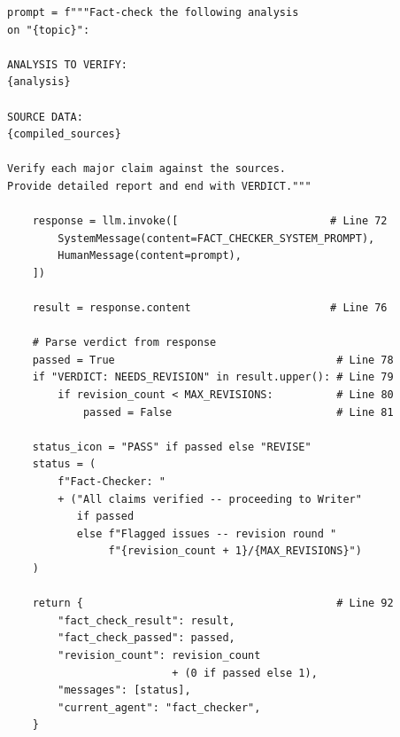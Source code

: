 \documentclass[12pt, a4paper]{article}
\begin{document}
\begin{lstlisting}[style=pythonstyle, title={\color{accentgreen}\faIcon{file} agents/fact\_checker.py --- Full Code (107 lines)}]
    prompt = f"""Fact-check the following analysis
on "{topic}":

ANALYSIS TO VERIFY:
{analysis}

SOURCE DATA:
{compiled_sources}

Verify each major claim against the sources.
Provide detailed report and end with VERDICT."""

    response = llm.invoke([                        # Line 72
        SystemMessage(content=FACT_CHECKER_SYSTEM_PROMPT),
        HumanMessage(content=prompt),
    ])

    result = response.content                      # Line 76

    # Parse verdict from response
    passed = True                                   # Line 78
    if "VERDICT: NEEDS_REVISION" in result.upper(): # Line 79
        if revision_count < MAX_REVISIONS:          # Line 80
            passed = False                          # Line 81

    status_icon = "PASS" if passed else "REVISE"
    status = (
        f"Fact-Checker: "
        + ("All claims verified -- proceeding to Writer"
           if passed
           else f"Flagged issues -- revision round "
                f"{revision_count + 1}/{MAX_REVISIONS}")
    )

    return {                                        # Line 92
        "fact_check_result": result,
        "fact_check_passed": passed,
        "revision_count": revision_count
                          + (0 if passed else 1),
        "messages": [status],
        "current_agent": "fact_checker",
    }
\end{lstlisting}
\end{document}
